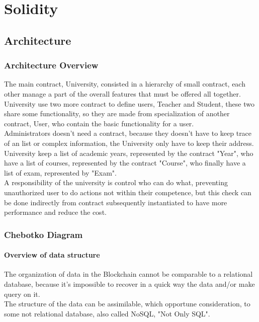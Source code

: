 \documentclass[ManualeSviluppatore.tex]{subfiles}
\begin{document}

\chapter{Solidity}
\section{Architecture}
\subsection{Architecture Overview}
The main contract, University, consisted in a hierarchy of small contract, each other manage a part of the overall features that must be offered all together.\\
University use two more contract to define users, Teacher and Student, these two share some functionality, so they are made from specialization of another contract, User, who contain the basic functionality for a user.\\
Administrators doesn't need a contract, because they doesn't have to keep trace of an list or complex information, the University only have to keep their address.\\
University keep a list of academic years, represented by the contract "Year", who have a list of courses, represented by the contract "Course", who finally have a list of exam, represented by "Exam".\\

A responsibility of the university is control who can do what, preventing unauthorized user to do actions not within their competence, but this check can be done indirectly from contract subsequently instantiated to have more performance and reduce the cost.\\

\subsection{Chebotko Diagram}
\subsubsection{Overview of data structure}
The organization of data in the Blockchain cannot be comparable to a relational database, because it's impossible to recover in a quick way the data and/or make query on it.\\
The structure of the data can be assimilable, which opportune consideration, to some not relational database, also called NoSQL, "Not Only SQL".\\
\end{document}
